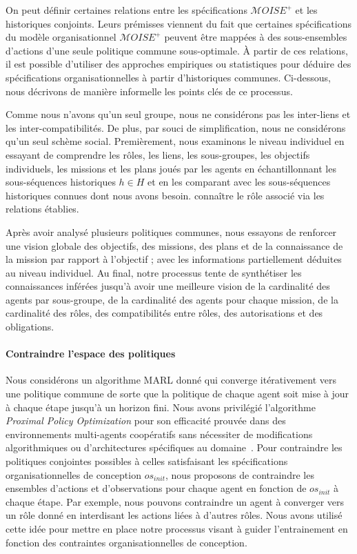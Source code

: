 \documentclass[contribution]{jfsma}
\newcounter{relation}
\begin{document}
On peut définir certaines relations entre les spécifications $\mathcal{M}OISE^+$ et les historiques conjoints. Leurs prémisses viennent du fait que certaines spécifications du modèle organisationnel $\mathcal{M}OISE^+$ peuvent être mappées à des sous-ensembles d'actions d'une seule politique commune sous-optimale.
À partir de ces relations, il est possible d’utiliser des approches empiriques ou statistiques pour déduire des spécifications organisationnelles à partir d’historiques communes. Ci-dessous, nous décrivons de manière informelle les points clés de ce processus.

Comme nous n’avons qu’un seul groupe, nous ne considérons pas les inter-liens et les inter-compatibilités. De plus, par souci de simplification, nous ne considérons qu’un seul schème social.
Premièrement, nous examinons le niveau individuel en essayant de comprendre les rôles, les liens, les sous-groupes, les objectifs individuels, les missions et les plans joués par les agents en échantillonnant les sous-séquences historiques $h \in H$ et en les comparant avec les sous-séquences historiques connues dont nous avons besoin. connaître le rôle associé via les relations établies.

Après avoir analysé plusieurs politiques communes, nous essayons de renforcer une vision globale des objectifs, des missions, des plans et de la connaissance de la mission par rapport à l'objectif ; avec les informations partiellement déduites au niveau individuel.
Au final, notre processus tente de synthétiser les connaissances inférées jusqu'à avoir une meilleure vision de la cardinalité des agents par sous-groupe, de la cardinalité des agents pour chaque mission, de la cardinalité des rôles, des compatibilités entre rôles, des autorisations et des obligations.

\paragraph{\textbf{Contraindre l'espace des politiques}}

Nous considérons un algorithme MARL donné qui converge itérativement vers une politique commune de sorte que la politique de chaque agent soit mise à jour à chaque étape jusqu'à un horizon fini.
Nous avons privilégié l'algorithme \emph{Proximal Policy Optimization} pour son efficacité prouvée dans des environnements multi-agents coopératifs sans nécessiter de modifications algorithmiques ou d'architectures spécifiques au domaine~\cite{Yu2022}.
Pour contraindre les politiques conjointes possibles à celles satisfaisant les spécifications organisationnelles de conception $os_{init}$, nous proposons de contraindre les ensembles d'actions et d'observations pour chaque agent en fonction de $os_{init}$ à chaque étape. Par exemple, nous pouvons contraindre un agent à converger vers un rôle donné en interdisant les actions liées à d’autres rôles. Nous avons utilisé cette idée pour mettre en place notre processus visant à guider l'entrainement en fonction des contraintes organisationnelles de conception.
\end{document}

